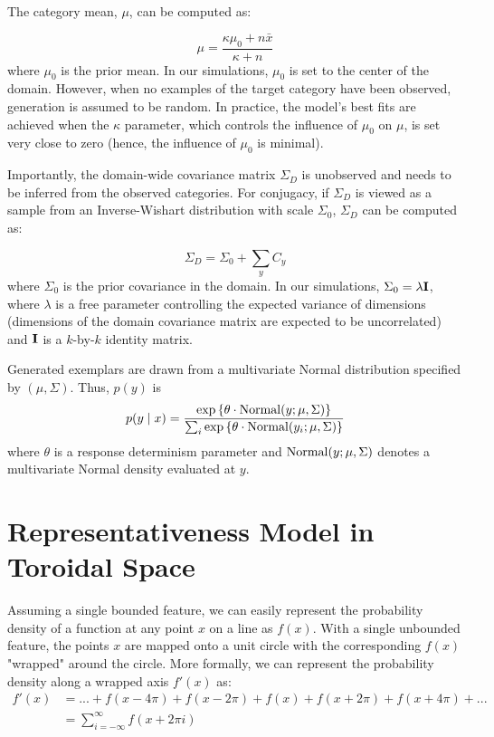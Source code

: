 \documentclass[pdflatex,sn-apa]{sn-jnl}%
\theoremstyle{thmstyleone}%
\theoremstyle{thmstyletwo}%
\theoremstyle{thmstylethree}%
\begin{document}
\begin{appendices}
The category mean, $\mu$, can be computed as:

\begin{equation} \mu = \dfrac {\kappa\mu_{0} + n \bar{x}} {\kappa + n}
    \label{eq:category_mus_jk13}
\end{equation}
% 
where $\mu_{0}$ is the prior mean. In our simulations, $\mu_{0}$ is set to the
center of the domain. However, when no examples of the target category have been
observed, generation is assumed to be random. In practice, the model's best fits
are achieved when the $\kappa$ parameter, which controls the influence of
$\mu_0$ on $\mu$, is set very close to zero (hence, the influence of $\mu_0$ is
minimal).

Importantly, the domain-wide covariance matrix $\Sigma_D$ is unobserved and
needs to be inferred from the observed categories. For conjugacy, if $\Sigma_D$
is viewed as a sample from an Inverse-Wishart distribution with scale
$\Sigma_0$, $\Sigma_D$ can be computed as:

 \begin{equation} \Sigma_D = \Sigma_0 + \sum_y{C_y}
    \label{eq:category_sigmas}
\end{equation}
% 
where $\Sigma_0$ is the prior covariance in the domain. In our simulations,
$\Sigma_0 = \lambda {\bf I}$, where $\lambda$ is a free parameter controlling
the expected variance of dimensions (dimensions of the domain covariance matrix
are expected to be uncorrelated) and ${\bf I}$ is a $k$-by-$k$ identity matrix.

Generated exemplars are drawn from a multivariate Normal distribution specified
by $(\mu, \Sigma)$. Thus, $p(y)$ is
\begin{equation} p(y \mid x) = \dfrac {\exp \left \{ \theta \cdot {\rm
Normal}(y; \mu, \Sigma) \right \} } {\sum_i \exp \left \{ \theta \cdot {\rm
Normal}(y_i; \mu, \Sigma) \right \} }
\end{equation}
% 
where $\theta$ is a response determinism parameter and ${\rm Normal}(y; \mu,
\Sigma)$ denotes a multivariate Normal density evaluated at $y$.

\newpage
\section{Representativeness Model in Toroidal Space}
\label{ap:wrapgauss}

Assuming a single bounded feature, we can easily represent the probability
density of a function at any point $x$ on a line as $f(x)$. With a single
unbounded feature, the points $x$ are mapped onto a unit circle with the
corresponding $f(x)$ "wrapped" around the circle. More formally, we can
represent the probability density along a wrapped axis $f'(x)$ as:
\begin{align}
f'(x) &= ... + f(x-4\pi) + f(x-2\pi) + f(x) + f(x+2\pi) + f(x+4\pi) + ...\\
     &= \sum_{i=-\infty}^{\infty} f(x + 2\pi i)
\end{align}


\end{appendices}
\end{document}
